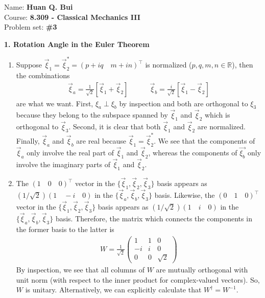 \documentclass{article}
\theoremstyle{definition}
\newcommand{\f}[2]{\frac{#1}{#2}}
\newcommand{\lb}{\left[}
\newcommand{\rb}{\right]}
\begin{document}
\begin{framed}
	\noindent Name: \textbf{Huan Q. Bui}\\
	Course: \textbf{8.309 - Classical Mechanics III}\\
	Problem set: \textbf{\#3}
\end{framed}
	
	


\noindent \textbf{1. Rotation Angle in the Euler Theorem}


\begin{enumerate}[label=(\alph*)]
	\item Suppose $\vec{\xi}_1 = \vec{\xi}_2^* = (p+iq \quad m+in)^\top$ is normalized ($p,q,m,n\in \mathbb{R}$), then the combinations
	\begin{align*}
	\boxed{\vec{\xi}_a = \f{1}{\sqrt{2}}\lb \vec{\xi}_1 + \vec{\xi}_2  \rb \quad\quad\quad 
	\vec{\xi}_b = \f{i}{\sqrt{2}}\lb \vec{\xi}_1 - \vec{\xi}_2 \rb}
	\end{align*}
	are what we want. First,  $\xi_a \perp \xi_b$ by inspection and both are orthogonal to $\xi_3$ because they belong to the subspace spanned by $\vec{\xi}_1$ and $\vec{\xi}_2$ which is orthogonal to $\vec{\xi}_3$. Second, it is clear that both $\vec{\xi}_1$ and $\vec{\xi}_2$ are normalized. Finally, $\vec{\xi}_a$ and $\vec{\xi}_b$ are real because $\vec{\xi}_1 = \vec{\xi}_2^*$. We see that the components of $\vec{\xi}_a$ only involve the real part of $\vec{\xi}_1$ and $\vec{\xi}_2$, whereas the components of $\vec{\xi_b}$ only involve the imaginary parts of $\vec{\xi}_1$ and $\vec{\xi}_2$. 
	
	
	\item The $(1\quad 0 \quad 0)^\top$ vector in the $\{\vec{\xi}_1, \vec{\xi}_2, \vec{\xi}_3\}$ basis appears as $(1/\sqrt{2}) (1\quad -i\quad 0)$ in the $\{\vec{\xi}_a, \vec{\xi}_b, \vec{\xi}_3\}$ basis. Likewise, the $(0\quad 1 \quad 0)^\top$ vector in the $\{\vec{\xi}_1, \vec{\xi}_2, \vec{\xi}_3\}$ basis appears as $(1/\sqrt{2}) (1\quad i\quad 0)$ in the $\{\vec{\xi}_a, \vec{\xi}_b, \vec{\xi}_3\}$ basis. Therefore, the matrix which connects the components in the former basis to the latter is 
	\begin{align*}
	\boxed{W = \f{1}{\sqrt{2}}\begin{pmatrix}
	1 & 1 & 0 \\ -i & i & 0 \\ 0 & 0 & \sqrt{2}
	\end{pmatrix}}
	\end{align*}
	By inspection, we see that all columns of $W$ are mutually orthogonal with unit norm (with respect to the inner product for complex-valued vectors). So, $W$ is unitary. Alternatively, we can explicitly calculate that $W^\dagger = W^{-1}$. 
	

\end{enumerate}
\end{document}
